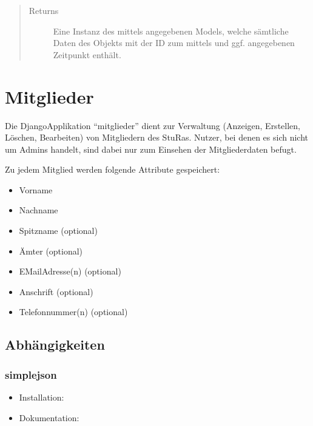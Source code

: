 \documentclass[letterpaper,10pt,english]{sphinxmanual}
\begin{document}
\begin{fulllineitems}
\begin{quote}
\begin{description}
\begin{itemize}
\end{itemize}

\item[{Returns}] \leavevmode
Eine Instanz des mittels  angegebenen Models, welche sämtliche Daten des Objekts mit der ID  zum mittels
 und ggf.  angegebenen Zeitpunkt enthält.

\end{description}\end{quote}

\end{fulllineitems}



\section{Mitglieder}
\label{\detokenize{masterCodeDoc:mitglieder}}
Die Django\sphinxhyphen{}Applikation “mitglieder” dient zur Verwaltung (Anzeigen, Erstellen, Löschen, Bearbeiten) von Mitgliedern des StuRas. Nutzer, bei denen es sich nicht um Admins handelt, sind dabei nur zum Einsehen der Mitgliederdaten befugt.

Zu jedem Mitglied werden folgende Attribute gespeichert:
\begin{itemize}
\item {} 
Vorname

\item {} 
Nachname

\item {} 
Spitzname (optional)

\item {} 
Ämter (optional)

\item {} 
E\sphinxhyphen{}Mail\sphinxhyphen{}Adresse(n) (optional)

\item {} 
Anschrift (optional)

\item {} 
Telefonnummer(n) (optional)

\end{itemize}


\subsection{Abhängigkeiten}
\label{\detokenize{masterCodeDoc:id5}}

\subsubsection{simplejson}
\label{\detokenize{masterCodeDoc:simplejson}}\begin{itemize}
\item {} 
Installation: 

\item {} 
Dokumentation: 

\end{itemize}
\end{document}
